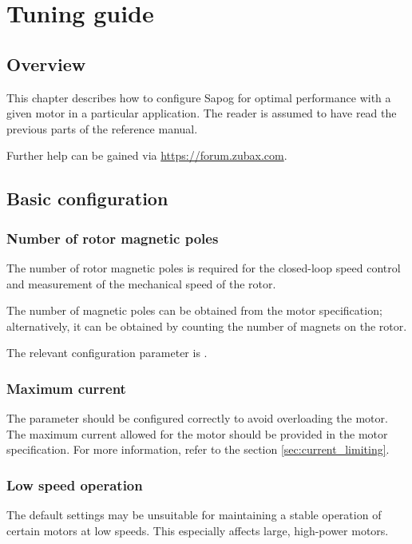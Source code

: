 \documentclass{zubaxdoc}
\begin{document}
\chapter{Tuning guide}

\section{Overview}

This chapter describes how to configure Sapog for optimal performance with a given motor
in a particular application.
The reader is assumed to have read the previous parts of the reference manual.

Further help can be gained via \url{https://forum.zubax.com}.

\section{Basic configuration}

\subsection{Number of rotor magnetic poles}

The number of rotor magnetic poles is required for the closed-loop speed control and
measurement of the mechanical speed of the rotor.

The number of magnetic poles can be obtained from the motor specification;
alternatively, it can be obtained by counting the number of magnets on the rotor.

The relevant configuration parameter is .

\subsection{Maximum current}

The parameter  should be configured correctly to avoid overloading the motor.
The maximum current allowed for the motor should be provided in the motor specification.
For more information, refer to the section \ref{sec:current_limiting}.

\subsection{Low speed operation}

The default settings may be unsuitable for maintaining a stable operation of certain motors at low speeds.
This especially affects large, high-power motors.
\end{document}
